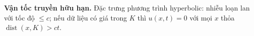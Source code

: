 \textbf{Vận tốc truyền hữu hạn.}
Đặc trưng phương trình hyperbolic: nhiễu loạn lan với tốc độ $\le c$; nếu dữ liệu có giá trong $K$ thì $u(x,t)=0$ với mọi $x$ thỏa $\operatorname{dist}(x,K)>ct$.
